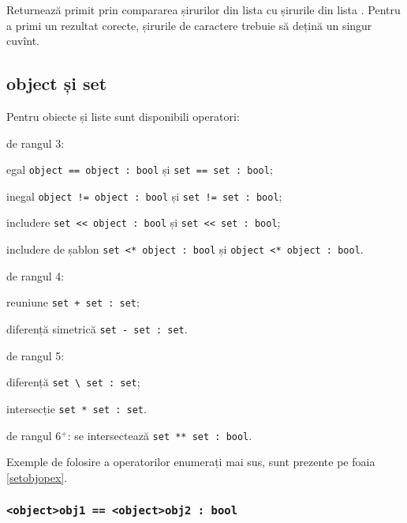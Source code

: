 Returnează primit prin compararea șirurilor din lista  cu șirurile din lista .
Pentru a primi un rezultat corecte, șirurile de caractere trebuie să dețină un singur cuvînt.

\subsection{{\color{lightblue}object} și {\color{lightblue}set}}

Pentru obiecte și liste sunt disponibili operatori:
\begin{icItems}
	\item
		de rangul 3:
		\begin{icItems}
		\item
			egal \lstinline|object == object : bool| și \lstinline|set == set : bool|;
		\item
			inegal \lstinline|object != object : bool| și \lstinline|set != set : bool|;
		\item
			includere \lstinline|set << object : bool| și \lstinline|set << set : bool|;
		\item
			includere de șablon \lstinline|set <* object : bool| și \lstinline|object <* object : bool|.
		\end{icItems}
	\item
		de rangul 4:
		\begin{icItems}
		\item
			reuniune \lstinline|set + set : set|;
		\item
			diferență simetrică \lstinline|set - set : set|.
		\end{icItems}
	\item
		de rangul 5:
		\begin{icItems}
		\item
			diferență \lstinline`set \ set : set`;
		\item
			intersecție \lstinline`set * set : set`.
		\end{icItems}
	\item
		de rangul 6$^+$: se intersectează \lstinline|set ** set : bool|.
\end{icItems}

Exemple de folosire a operatorilor enumerați mai sus, sunt prezente pe foaia \ref{setobjopex}.

\subsubsection{\lstinline`<object>obj1 == <object>obj2 : bool`}

